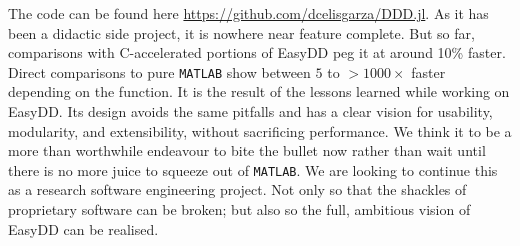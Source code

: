 The code can be found here \href{https://github.com/dcelisgarza/DDD.jl}{https://github.com/dcelisgarza/DDD.jl}. As it has been a didactic side project, it is nowhere near feature complete. But so far, comparisons with C-accelerated portions of EasyDD peg it at around 10\% faster. Direct comparisons to pure \texttt{MATLAB} show between $5$ to $>1000 \times$ faster depending on the function. It is the result of the lessons learned while working on EasyDD. Its design avoids the same pitfalls and has a clear vision for usability, modularity, and extensibility, without sacrificing performance. We think it to be a more than worthwhile endeavour to bite the bullet now rather than wait until there is no more juice to squeeze out of \texttt{MATLAB}. We are looking to continue this as a research software engineering project. Not only so that the shackles of proprietary software can be broken; but also so the full, ambitious vision of EasyDD can be realised.

